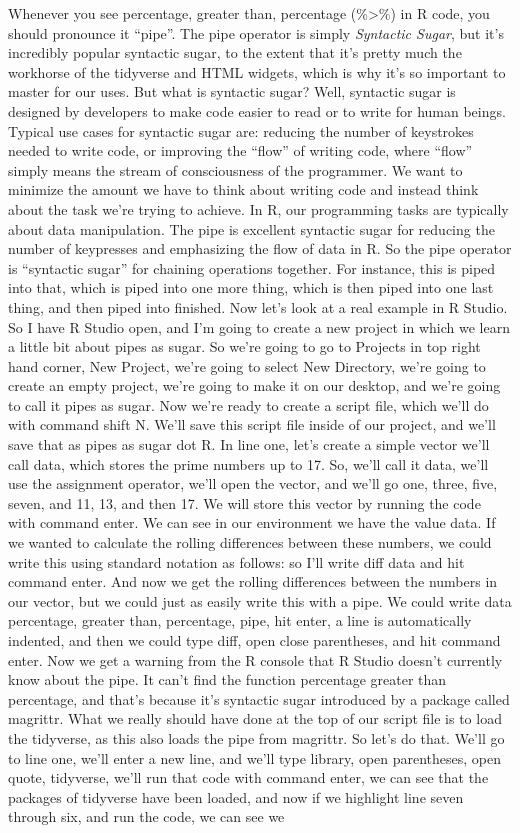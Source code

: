 \documentclass[
]{article}
\begin{document}
Whenever you see percentage, greater than, percentage (\%\textgreater\%) in R code, you should pronounce it ``pipe''. The pipe operator is simply \emph{Syntactic Sugar}, but it's incredibly popular syntactic sugar, to the extent that it's pretty much the workhorse of the tidyverse and HTML widgets, which is why it's so important to master for our uses. But what is syntactic sugar? Well, syntactic sugar is designed by developers to make code easier to read or to write for human beings. Typical use cases for syntactic sugar are: reducing the number of keystrokes needed to write code, or improving the ``flow'' of writing code, where ``flow'' simply means the stream of consciousness of the programmer. We want to minimize the amount we have to think about writing code and instead think about the task we're trying to achieve. In R, our programming tasks are typically about data manipulation. The pipe is excellent syntactic sugar for reducing the number of keypresses and emphasizing the flow of data in R. So the pipe operator is ``syntactic sugar'' for chaining operations together. For instance, this is piped into that, which is piped into one more thing, which is then piped into one last thing, and then piped into finished. Now let's look at a real example in R Studio. So I have R Studio open, and I'm going to create a new project in which we learn a little bit about pipes as sugar. So we're going to go to Projects in top right hand corner, New Project, we're going to select New Directory, we're going to create an empty project, we're going to make it on our desktop, and we're going to call it pipes as sugar. Now we're ready to create a script file, which we'll do with command shift N. We'll save this script file inside of our project, and we'll save that as pipes as sugar dot R. In line one, let's create a simple vector we'll call data, which stores the prime numbers up to 17. So, we'll call it data, we'll use the assignment operator, we'll open the vector, and we'll go one, three, five, seven, and 11, 13, and then 17. We will store this vector by running the code with command enter. We can see in our environment we have the value data. If we wanted to calculate the rolling differences between these numbers, we could write this using standard notation as follows: so I'll write diff data and hit command enter. And now we get the rolling differences between the numbers in our vector, but we could just as easily write this with a pipe. We could write data percentage, greater than, percentage, pipe, hit enter, a line is automatically indented, and then we could type diff, open close parentheses, and hit command enter. Now we get a warning from the R console that R Studio doesn't currently know about the pipe. It can't find the function percentage greater than percentage, and that's because it's syntactic sugar introduced by a package called magrittr. What we really should have done at the top of our script file is to load the tidyverse, as this also loads the pipe from magrittr. So let's do that. We'll go to line one, we'll enter a new line, and we'll type library, open parentheses, open quote, tidyverse, we'll run that code with command enter, we can see that the packages of tidyverse have been loaded, and now if we highlight line seven through six, and run the code, we can see we 
\end{document}
